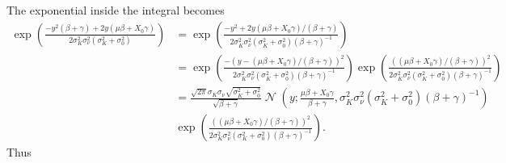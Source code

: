 \documentclass[a4paper]{amsart}
\DeclareMathOperator{\N}{\mathcal{N}}
\begin{document}
The exponential inside the integral becomes
\begin{align*}
\exp\left( \frac{-y^2(\beta + \gamma)+2y(\mu \beta + X_0\gamma)}{2\sigma_K^2\sigma_{\nu}^2(\sigma_K^2 + \sigma_0^2)}\right) &= \exp\left( \frac{-y^2+2y(\mu \beta + X_0\gamma)/(\beta + \gamma)}{2\sigma_K^2\sigma_{\nu}^2(\sigma_K^2 + \sigma_0^2)(\beta + \gamma)^{-1}}\right)\\
&= \exp\left( \frac{-\left(y - (\mu \beta + X_0\gamma)/(\beta + \gamma)\right)^2}{2\sigma_K^2\sigma_{\nu}^2(\sigma_K^2 + \sigma_0^2)(\beta + \gamma)^{-1}}\right)\exp\left( \frac{\left((\mu \beta + X_0\gamma)/(\beta + \gamma)\right)^2}{2\sigma_K^2\sigma_{\nu}^2(\sigma_K^2 + \sigma_0^2)(\beta + \gamma)^{-1}}\right)\\
&= \frac{\sqrt{2\pi}\sigma_K\sigma_{\nu}\sqrt{\sigma_K^2 + \sigma_0^2}}{\sqrt{\beta + \gamma}}\N\left(y; \frac{\mu \beta + X_0\gamma}{\beta + \gamma}, \sigma_K^2\sigma_{\nu}^2(\sigma_K^2 + \sigma_0^2)(\beta + \gamma)^{-1}\right)\\
&\exp\left( \frac{\left((\mu \beta + X_0\gamma)/(\beta + \gamma)\right)^2}{2\sigma_K^2\sigma_{\nu}^2(\sigma_K^2 + \sigma_0^2)(\beta + \gamma)^{-1}}\right).
\end{align*}
Thus
\end{document}
